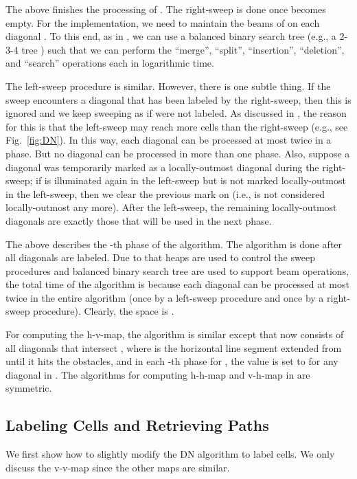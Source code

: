 \documentclass[english,runningheads,11pt]{llncs-revised}
\begin{document}
The above finishes the processing of .  The right-sweep is done
once  becomes empty. For the implementation, we
need to maintain the beams of  on each diagonal . To this end,
as in \cite{ref:DasGe91}, we can use
a balanced binary search tree (e.g., a 2-3-4 tree \cite{ref:CLRS09}) such that we can perform
the ``merge'', ``split'', ``insertion'',
``deletion'', and ``search'' operations each in logarithmic time.


The left-sweep procedure is similar. However, there is one
subtle thing. If the sweep encounters a diagonal  that has been
labeled by the right-sweep, then this is ignored and
we keep sweeping as if  were not labeled.
As discussed in
\cite{ref:DasGe91}, the reason for this is that the left-sweep may reach more
cells than the right-sweep (e.g., see Fig.~\ref{fig:DN}). In this way, each diagonal
can be processed at most twice in a phase. But no diagonal can be
processed in more than one phase.
Also, suppose a diagonal  was temporarily marked as a locally-outmost diagonal during the right-sweep; if  is illuminated again in the left-sweep but  is not marked locally-outmost in the left-sweep, then we clear the previous mark on  (i.e.,  is not considered locally-outmost  any more).
After the left-sweep, the
remaining locally-outmost diagonals are exactly those that will be
used in the next phase.

The above describes the -th phase of the algorithm. The algorithm
is done after all diagonals are labeled.
Due to that heaps are used to control the sweep procedures and balanced binary
search tree are used to support beam operations, the total time of the
algorithm is  because each diagonal can be processed at most
twice in the entire algorithm (once by a left-sweep procedure and
once by a right-sweep procedure). Clearly, the space is .

For computing the h-v-map, the algorithm is similar except that  now consists of all
diagonals that intersect , where  is the horizontal line segment
extended from  until it hits the obstacles, and in each -th
phase for , the value  is set to  for
any diagonal  in . The algorithms for computing
h-h-map and v-h-map in  are symmetric.

\subsection{Labeling Cells and Retrieving Paths}
\label{sec:labelcell}

We first show how to slightly modify the DN algorithm to label cells.
We only discuss the v-v-map since the other maps are similar.
\end{document}
